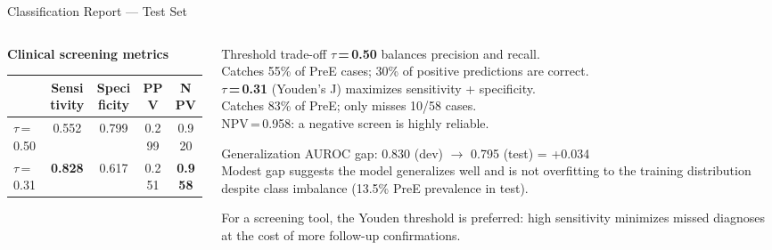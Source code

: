 \documentclass[10pt,aspectratio=169]{beamer}
\begin{document}
\begin{frame}{Classification Report --- Test Set}
\begin{columns}[T]
\begin{column}{0.52\textwidth}
      \vspace{0.8em}
      {\small\bfseries Clinical screening metrics}\\[0.3em]
      \footnotesize
      \begin{tabular}{@{}l cccc@{}}
        \toprule
        & \textbf{Sensitivity} & \textbf{Specificity} & \textbf{PPV} & \textbf{NPV} \\
        \midrule
        $\tau$\,=\,0.50 & 0.552 & 0.799 & 0.299 & 0.920 \\
        $\tau$\,=\,0.31 & \textbf{0.828} & 0.617 & 0.251 & \textbf{0.958} \\
        \bottomrule
      \end{tabular}
    \end{column}
    \begin{column}{0.46\textwidth}
      \small
      \begin{block}{\scriptsize Threshold trade-off}
        \scriptsize
        \textbf{$\tau$\,=\,0.50} balances precision and recall.\\
        Catches 55\% of PreE cases; 30\% of positive predictions are correct.\\[0.4em]
        \textbf{$\tau$\,=\,0.31} (Youden's J) maximizes sensitivity + specificity.\\
        Catches 83\% of PreE; only misses 10/58 cases.\\
        NPV\,=\,0.958: a negative screen is highly reliable.
      \end{block}

      \vspace{0.4em}
      \begin{block}{\scriptsize Generalization}
        \scriptsize
        AUROC gap: 0.830 (dev) $\to$ 0.795 (test) = +0.034\\[0.2em]
        Modest gap suggests the model generalizes well and is not
        overfitting to the training distribution despite class imbalance
        (13.5\% PreE prevalence in test).
      \end{block}

      \vspace{0.4em}
      {\footnotesize\color{coolgray}
      For a screening tool, the Youden threshold is preferred:
      high sensitivity minimizes missed diagnoses at the cost
      of more follow-up confirmations.}
    \end{column}
  \end{columns}
\end{frame}
\end{document}
